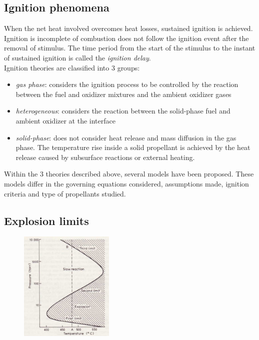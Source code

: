 \documentclass[12pt]{article}
\begin{document}
\subsection{Ignition phenomena}

When the net heat involved overcomes heat losses, sustained ignition is achieved. Ignition is incomplete of combustion does not follow the ignition event after the removal of stimulus. The time period from the start of the stimulus to the instant of sustained ignition is called the \textit{ignition delay}.\\
Ignition theories are classified into 3 groups:

\begin{itemize}
    \item \textit{gas phase}: considers the ignition process to be controlled by the reaction between the fuel and oxidizer mixtures and the ambient oxidizer gases
    \item \textit{heterogeneous}: considers the reaction between the solid-phase fuel and ambient oxidizer at the interface
    \item \textit{solid-phase}: does not consider heat release and mass diffusion in the gas phase. The temperature rise inside a solid propellant is achieved by the heat release caused by subsurface reactions or external heating.
\end{itemize}

Within the 3 theories described above, several models have been proposed. These models differ in the governing equations considered, assumptions made, ignition criteria and type of propellants studied.

\subsection{Explosion limits}

\begin{figure}[h!]
\centering
\includegraphics[width=0.4\textwidth]{figures/explosion.png}
\end{figure}
\end{document}
